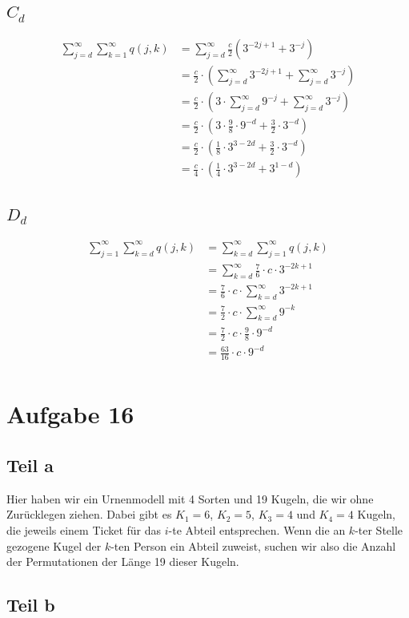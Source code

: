 \documentclass[10pt,a4paper]{article}
\begin{document}
\subsection{$C_{d}$}
\begin{align*}
  \sum_{j = d}^{\infty} \sum_{k = 1}^{\infty} q(j, k) & = \sum_{j = d}^{\infty} \frac{c}{2} \left( 3^{-2j + 1} + 3^{-j} \right)\\
  & = \frac{c}{2} \cdot \left( \sum_{j = d}^{\infty} 3^{-2j + 1} + \sum_{j = d}^{\infty} 3^{-j} \right)\\
  & = \frac{c}{2} \cdot \left( 3 \cdot \sum_{j = d}^{\infty} 9^{-j} + \sum_{j = d}^{\infty} 3^{-j} \right)\\
  & = \frac{c}{2} \cdot \left( 3 \cdot \frac{9}{8} \cdot 9^{-d} + \frac{3}{2} \cdot 3^{-d} \right)\\
  & = \frac{c}{2} \cdot \left( \frac{1}{8} \cdot 3^{3 - 2d} + \frac{3}{2} \cdot 3^{-d} \right)\\
  & = \frac{c}{4} \cdot \left( \frac{1}{4} \cdot 3^{3 - 2d} + 3^{1 - d} \right)\\
\end{align*}

\subsection{$D_{d}$}
\begin{align*}
  \sum_{j = 1}^{\infty} \sum_{k = d}^{\infty} q(j, k) & = \sum_{k = d}^{\infty} \sum_{j = 1}^{\infty} q(j, k)\\
  & = \sum_{k = d}^{\infty} \frac{7}{6} \cdot c \cdot 3^{-2k + 1}\\
  & = \frac{7}{6} \cdot c \cdot \sum_{k = d}^{\infty} 3^{-2k + 1}\\
  & = \frac{7}{2} \cdot c \cdot \sum_{k = d}^{\infty} 9^{-k}\\
  & = \frac{7}{2} \cdot c \cdot \frac{9}{8} \cdot 9^{-d}\\
  & = \frac{63}{16} \cdot c \cdot 9^{-d}\\
\end{align*}

\section{Aufgabe 16}

\subsection{Teil a}
Hier haben wir ein Urnenmodell mit 4 Sorten und 19 Kugeln, die wir ohne Zurücklegen ziehen.
Dabei gibt es $K_{1} = 6$, $K_{2} = 5$, $K_{3} = 4$ und $K_{4} = 4$ Kugeln, die jeweils einem Ticket für das $i$-te Abteil entsprechen.
Wenn die an $k$-ter Stelle gezogene Kugel der $k$-ten Person ein Abteil zuweist, suchen wir also die Anzahl der Permutationen der Länge 19 dieser Kugeln.


\subsection{Teil b}
\end{document}
